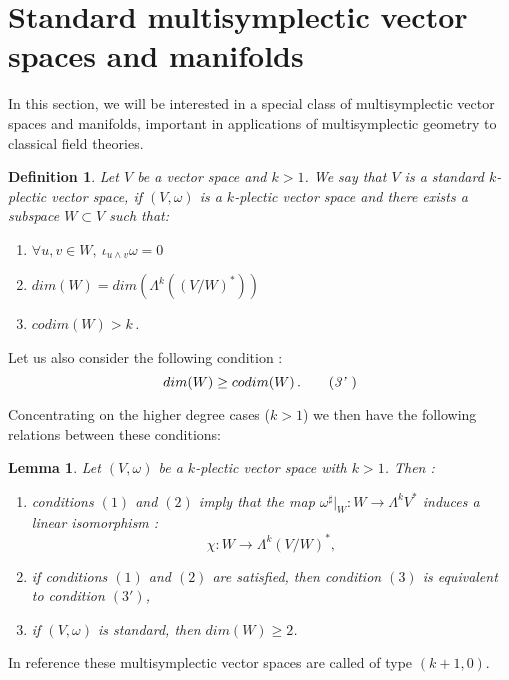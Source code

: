 \documentclass[a4paper,12pt,leqno]{article}
\newtheorem{lem}{Lemma}
\newtheorem{defa}{Definition}
\begin{document}
\section{Standard multisymplectic vector spaces and manifolds}

In this section, we will be interested in a special class of multisymplectic vector spaces and manifolds, important in applications 
of multisymplectic geometry to classical field theories. 


\begin{defa}
Let $V$ be a vector space and $k>1$. We say that $V$ is a standard $k$-plectic vector space, if $(V,\omega)$ is a $k$-plectic vector space and there exists a subspace $W\subset V$ such that:
\begin{enumerate}[label=(\arabic*)]
\item $\forall u,v\in W, \ \iota_{u\wedge v}\omega=0$
\item $dim(W)=dim(\Lambda^k((V/W)^*))$
\item $codim(W)>k\,$.
\end{enumerate}
\end{defa}

Let us also consider the following condition :
\begin{equation*}
 dim(W)\geq codim(W)\, .  \tag{\textit{3'} }
\end{equation*}

Concentrating on the higher degree cases ($k>1$) we then have the following relations between these conditions:

\begin{lem}
Let $(V,\omega)$ be a $k$-plectic vector space with $k>1$. Then :
\begin{enumerate}[label=(\roman*)]
\item conditions $(1)$ and $(2)$ imply that the map $\omega^{\sharp}|_{W}:W\rightarrow \Lambda^kV^*$ induces a linear isomorphism :
\begin{equation*}
\chi:W\rightarrow \Lambda^k(V/W)^*, 
\end{equation*}
\item if conditions $(1)$ and $(2)$ are satisfied, then condition $(3)$ is equivalent to condition $(3')$,
\item if $(V,\omega)$ is standard, then $dim(W)\geq 2$.
\end{enumerate}
\end{lem}

 In reference \cite{leodieg} these multisymplectic vector spaces are called of type $(k{+}1,0)$.
\end{document}
